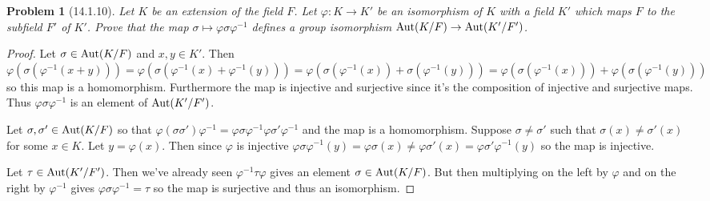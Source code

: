 \documentclass{article}
\newcommand{\aut}{\textup{Aut}}
\newtheorem{problem}{Problem}
\begin{document}
\begin{problem}[14.1.10]
Let $K$ be an extension of the field $F$. Let $\varphi : K \to K'$ be an isomorphism of $K$ with a field $K'$ which maps $F$ to the subfield $F'$ of $K'$. Prove that the map $\sigma \mapsto \varphi \sigma \varphi^{-1}$ defines a group isomorphism $\aut(K/F) \to \aut(K'/F')$.
\end{problem}
\begin{proof}
Let $\sigma \in \aut(K/F)$ and $x,y \in K'$. Then $\varphi(\sigma(\varphi^{-1}(x + y))) = \varphi(\sigma(\varphi^{-1}(x) + \varphi^{-1}(y))) = \varphi(\sigma(\varphi^{-1}(x)) + \sigma(\varphi^{-1}(y))) = \varphi(\sigma(\varphi^{-1}(x))) + \varphi(\sigma(\varphi^{-1}(y)))$ so this map is a homomorphism. Furthermore the map is injective and surjective since it's the composition of injective and surjective maps. Thus $\varphi \sigma \varphi^{-1}$ is an element of $\aut(K'/F')$.

Let $\sigma, \sigma' \in \aut(K/F)$ so that $\varphi (\sigma \sigma') \varphi^{-1} = \varphi \sigma \varphi^{-1} \varphi \sigma' \varphi^{-1}$ and the map is a homomorphism. Suppose $\sigma \neq \sigma'$ such that $\sigma(x) \neq \sigma'(x)$ for some $x \in K$. Let $y = \varphi(x)$. Then since $\varphi$ is injective $\varphi \sigma \varphi^{-1}(y) = \varphi \sigma (x) \neq \varphi \sigma'(x) = \varphi \sigma' \varphi^{-1} (y)$ so the map is injective.

Let $\tau \in \aut(K'/F')$. Then we've already seen $\varphi^{-1} \tau \varphi$ gives an element $\sigma \in \aut(K/F)$. But then multiplying on the left by $\varphi$ and on the right by $\varphi^{-1}$ gives $\varphi \sigma \varphi^{-1} = \tau$ so the map is surjective and thus an isomorphism.
\end{proof}
\end{document}
